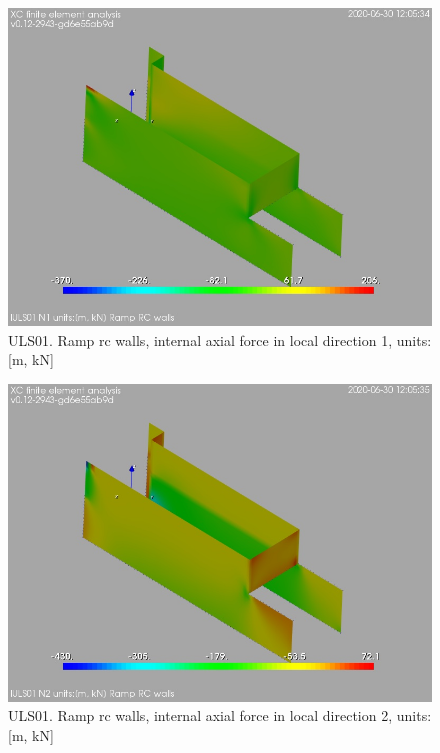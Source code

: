 \begin{figure}
\begin{center}
\includegraphics[width=\linewidth]{ramp_wall/resLC/text/graphics/resSimplLC/lULS01wallsN1}
\caption{ULS01. Ramp rc walls, internal axial force in local direction 1, units:[m, kN]}
\end{center}
\end{figure}
\begin{figure}
\begin{center}
\includegraphics[width=\linewidth]{ramp_wall/resLC/text/graphics/resSimplLC/lULS01wallsN2}
\caption{ULS01. Ramp rc walls, internal axial force in local direction 2, units:[m, kN]}
\end{center}
\end{figure}
